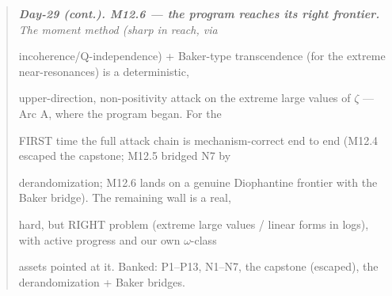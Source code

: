 \documentclass[10pt]{article}
\begin{document}
\begin{quote}\itshape
\textbf{Day-29 (cont.). M12.6 --- the program reaches its right frontier.} The moment method (sharp in reach, via\par
incoherence/Q-independence) + Baker-type transcendence (for the extreme near-resonances) is a deterministic,\par
upper-direction, non-positivity attack on the extreme large values of \ensuremath{\zeta} --- Arc A, where the program began. For the\par
FIRST time the full attack chain is mechanism-correct end to end (M12.4 escaped the capstone; M12.5 bridged N7 by\par
derandomization; M12.6 lands on a genuine Diophantine frontier with the Baker bridge). The remaining wall is a real,\par
hard, but RIGHT problem (extreme large values / linear forms in logs), with active progress and our own \ensuremath{\omega}-class\par
assets pointed at it. Banked: P1--P13, N1--N7, the capstone (escaped), the derandomization + Baker bridges.\par
\end{quote}
\end{document}
